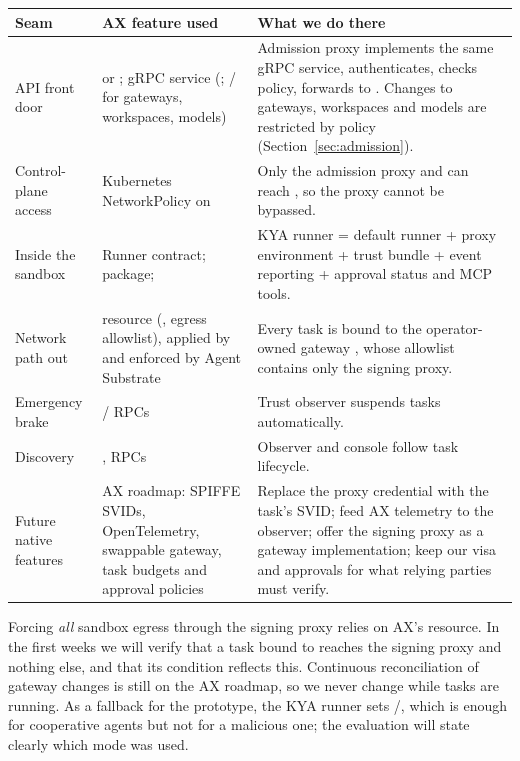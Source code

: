 \begin{center}
\small
\begin{tabularx}{\linewidth}{@{}L{3.2cm}L{4.5cm}Y@{}}
\toprule
\textbf{Seam} & \textbf{AX feature used} & \textbf{What we do there}\\
\midrule
API front door &  or ; gRPC service  (; / for gateways, workspaces, models) & Admission proxy implements the same gRPC service, authenticates, checks policy, forwards to . Changes to gateways, workspaces and models are restricted by policy (Section~\ref{sec:admission}).\\
Control-plane access & Kubernetes NetworkPolicy on  & Only the admission proxy and  can reach , so the proxy cannot be bypassed.\\
Inside the sandbox & Runner contract;  package;  & KYA runner = default runner + proxy environment + trust bundle + event reporting + approval status and MCP tools.\\
Network path out &  resource (, egress allowlist), applied by  and enforced by Agent Substrate & Every task is bound to the operator-owned gateway , whose allowlist contains only the signing proxy.\\
Emergency brake &  /  RPCs & Trust observer suspends tasks automatically.\\
Discovery & ,  RPCs & Observer and console follow task lifecycle.\\
Future native features & AX roadmap: SPIFFE SVIDs, OpenTelemetry, swappable gateway, task budgets and approval policies & Replace the proxy credential with the task's SVID; feed AX telemetry to the observer; offer the signing proxy as a gateway implementation; keep our visa and approvals for what relying parties must verify.\\
\bottomrule
\end{tabularx}
\end{center}

\begin{warnbox}
Forcing \emph{all} sandbox egress through the signing proxy relies on AX's  resource. In the first weeks we will verify that a task bound to  reaches the signing proxy and nothing else, and that its  condition reflects this. Continuous reconciliation of gateway changes is still on the AX roadmap, so we never change  while tasks are running. As a fallback for the prototype, the KYA runner sets /, which is enough for cooperative agents but not for a malicious one; the evaluation will state clearly which mode was used.
\end{warnbox}

